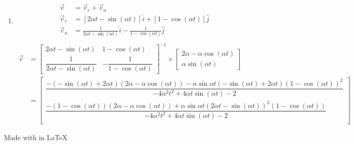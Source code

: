 \documentclass[11pt,letterpaper]{article}
\begin{document}
\begin{enumerate}
\begin{enumerate}
    \item 
        \begin{align}
            \vec{v} &= \vec{v}_{r}+\vec{v}_{n} \\
            \vec{v}_{r}&=[2\alpha t-\sin(\alpha t)]\hat{i}+[1-\cos(\alpha t)]\hat{j} \\
            \vec{v}_{n}&=\frac{1}{2\alpha t-\sin(\alpha t)}\hat{i}-\frac{1}{1-\cos(\alpha t)}\hat{j} \\
        \end{align}
        \begin{align}
            \vec{v} &=
            \begin{bmatrix}
                2\alpha t-\sin(\alpha t) & 1-\cos(\alpha t) \\
                \dfrac{1}{2\alpha t-\sin(\alpha t)} & -\dfrac{1}{1-\cos(\alpha t)}
            \end{bmatrix}^{-1}
            \times
            \begin{bmatrix}
                2\alpha-\alpha \cos(\alpha t) \\
                \alpha \sin(\alpha t)
            \end{bmatrix} \\
                    &=
                    \begin{bmatrix}
                        \dfrac{-(-\sin(\alpha t)+2\alpha t)(2\alpha-\alpha \cos(\alpha t))-\alpha \sin\alpha t(-\sin(\alpha t)+2\alpha t)(1-\cos(\alpha t))^{2}}{-4\alpha^{2} t^{2}+4\alpha t\sin(\alpha t)-2} \\
                        \dfrac{-(1-\cos(\alpha t))(2\alpha-\alpha \cos(\alpha t))+\alpha \sin\alpha t(2\alpha t-\sin(\alpha t))^{2}(1-\cos(\alpha t))}{-4\alpha^{2} t^{2}+4\alpha t\sin(\alpha t)-2} \\
                    \end{bmatrix}
        \end{align}

\end{enumerate}

\end{enumerate}

\vfill

\begin{center}
    Made with  in {\LaTeX}
\end{center}
\end{document}
